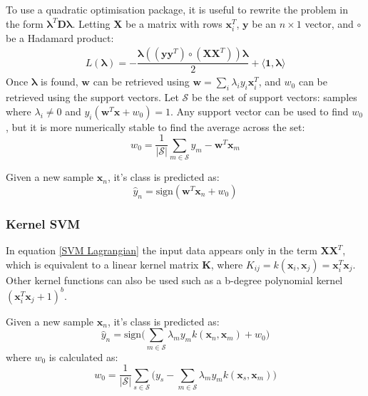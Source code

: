 \begin{appendices}
To use a quadratic optimisation package, it is useful to rewrite the problem in the form $\boldsymbol{\lambda}^T \textbf{D} \boldsymbol{\lambda}$. Letting $\textbf{X}$ be a matrix with rows $\textbf{x}_i^T$, $\textbf{y}$ be an $n \times 1$ vector, and $\circ$ be a Hadamard product:
\begin{align}\label{SVM Lagrangian}
L(\boldsymbol{\lambda}) =- \dfrac{\boldsymbol{\lambda} ((\textbf{yy}^T) \circ (\textbf{XX}^T)) \boldsymbol{\lambda}}{2} + \langle \textbf{1}, \boldsymbol{\lambda} \rangle
\end{align}
Once $\boldsymbol{\lambda}$ is found, $\textbf{w}$ can be retrieved using $\textbf{w} = \sum_i \lambda_i y_i \textbf{x}_i^T$, and $w_0$ can be retrieved using the support vectors. Let $\mathcal{S}$ be the set of support vectors: samples where $\lambda_i \neq 0$ and $y_i (\textbf{w}^T \textbf{x} + w_0) = 1$. Any support vector can be used to find $w_0$, but it is more numerically stable to find the average across the set:
$$w_0 = \frac{1}{|\mathcal{S}|} \sum_{m \in \mathcal{S}} y_m - \textbf{w}^T \textbf{x}_m$$

Given a new sample $\textbf{x}_n$, it's class is predicted as:
$$\hat{y}_n = \text{sign} (\textbf{w}^T \textbf{x}_n + w_0)$$

\subsubsection{Kernel SVM}
In equation \ref{SVM Lagrangian} the input data appears only in the term $\textbf{XX}^T$, which is equivalent to a linear kernel matrix $\textbf{K}$, where $K_{ij} = k(\textbf{x}_i, \textbf{x}_j) = \textbf{x}_i^T \textbf{x}_j$. Other kernel functions can also be used such as a b-degree polynomial kernel $(\textbf{x}_i^T \textbf{x}_j +1)^b$.

Given a new sample $\textbf{x}_n$, it's class is predicted as:
$$\hat{y}_n = \text{sign} \Big(\sum_{m \in \mathcal{S}} \lambda_m y_m k(\textbf{x}_n, \textbf{x}_m) + w_0 \Big)$$
where $w_0$ is calculated as:
$$w_0 = \frac{1}{|\mathcal{S}|} \sum_{s \in \mathcal{S}} \Big( y_s - \sum_{m \in \mathcal{S}} \lambda_m y_m k(\textbf{x}_s, \textbf{x}_m) \Big)$$

\end{appendices}
